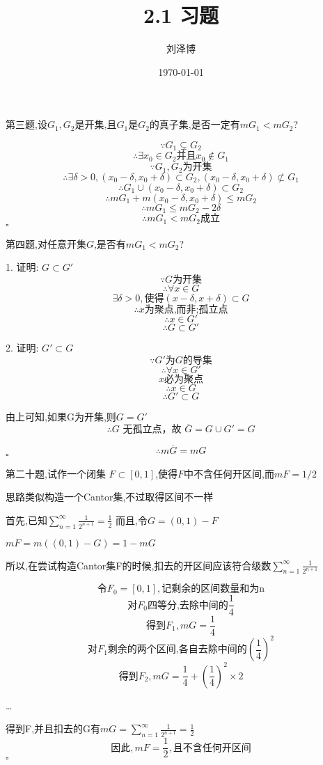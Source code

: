 \documentclass[a4paper]{article}
\title{2.1 习题}
\author{刘泽博}
\date{\today}
\begin{document}
    \maketitle
    第三题,设$G_1,G_2$是开集,且$G_1$是$G_2$的真子集,是否一定有$mG_1<mG_2$?

        \[\because G_1 \subsetneq G_2\]
        \[\therefore \exists x_0 \in G_2 \text{并且}  x_0 \notin G_1\]
        \[\because G_1,G_2 \text{为开集}\]
        \[\therefore \exists \delta > 0,(x_0 - \delta,x_0 + \delta) \subset G_2,(x_0 - \delta,x_0 + \delta)\not\subset G_1\]
        \[\therefore G_1\cup(x_0 - \delta,x_0 + \delta) \subset G_2\]
        \[\therefore mG_1 + m(x_0 - \delta,x_0 + \delta) \leq mG_2\]
        \[\therefore mG_1 \leq mG_2 - 2\delta\]
        \[\therefore mG_1<mG_2 \text{成立}\]
    \hfill $\square$

    第四题,对任意开集$G$,是否有$mG_1<mG_2$?

        1. 证明: $G \subset G'$
        \[\because G \text{为开集}\]
        \[\therefore \forall x \in G\]
        \[\exists \delta > 0,\text{使得}(x-\delta,x+\delta)\subset G\]
        \[\therefore x \text{为聚点,而非;孤立点}\]
        \[\therefore x \in G'\]
        \[\therefore G \subset G'\]

        2. 证明: $G' \subset G$
        \[\because G'\text{为} G \text{的导集}\]
        \[\therefore \forall x \in G'\]
        \[x \text{必为聚点}\]
        \[\therefore x \in G\]
        \[\therefore G' \subset G\]

        由上可知,如果G为开集,则$G = G'$
        \[\therefore G \text{ 无孤立点，故 } \overline{G} = G \cup G' = G\]

        \[\therefore m\overline{G}=mG\]
    \hfill $\square$

    第二十题,试作一个闭集 $F\subset[0,1]$,使得$F$中不含任何开区间,而$mF=1/2$

        思路类似构造一个Cantor集,不过取得区间不一样

        首先,已知$\sum_{n=1}^{\infty} \frac{1}{2^{n+1}} = \frac{1}{2}$
        而且,令$G=(0,1)-F$

        $mF=m((0,1)-G)=1-mG$
        
        所以,在尝试构造Cantor集F的时候,扣去的开区间应该符合级数$\sum_{n=1}^{\infty} \frac{1}{2^{n+1}}$

        \[\text{令}F_0=[0,1],\text{记剩余的区间数量和为n}\]
        \[\text{对}F_0\text{四等分,去除中间的}\frac{1}{4}\]
        \[\text{得到}F_1,mG=\frac{1}{4}\]
        \[\text{对}F_1\text{剩余的两个区间,各自去除中间的}(\frac{1}{4})^2\]
        \[\text{得到}F_2,mG=\frac{1}{4} + (\frac{1}{4})^2\times2\]

        \ldots

        得到F,并且扣去的G有$mG=\sum_{n=1}^{\infty} \frac{1}{2^{n+1}} = \frac{1}{2}$
        \[\text{因此},mF=\frac{1}{2},\text{且不含任何开区间}\]
    \hfill $\square$
\end{document}
